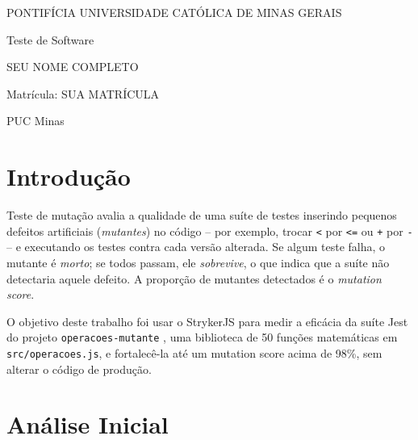 \documentclass[12pt,oneside,a4paper,article,english,brazil]{abntex2}
\newcommand{\disciplina}{Teste de Software}
\newcommand{\nomealuno}{SEU NOME COMPLETO}
\newcommand{\matricula}{SUA MATRÍCULA}
\begin{document}
\frenchspacing

\begin{capa}
  \center
  {\ABNTEXchapterfont\large PONTIFÍCIA UNIVERSIDADE CATÓLICA DE MINAS GERAIS}

  \vspace{0.5cm}
  {\large \disciplina}

  \vfill
  {\ABNTEXchapterfont\large \nomealuno}

  \vspace{0.3cm}
  {\large Matrícula: \matricula}

  \vfill
  {\ABNTEXchapterfont\bfseries\LARGE \imprimirtitulo}

  \vfill
  \large PUC Minas

  \large \imprimirlocal

  \large \imprimirdata

  \vspace*{1cm}
\end{capa}

\textual

\section{Introdução}

Teste de mutação avalia a qualidade de uma suíte de testes inserindo pequenos
defeitos artificiais (\emph{mutantes}) no código -- por exemplo, trocar
\texttt{<} por \texttt{<=} ou \texttt{+} por \texttt{-} -- e executando os
testes contra cada versão alterada. Se algum teste falha, o mutante é
\emph{morto}; se todos passam, ele \emph{sobrevive}, o que indica que a suíte
não detectaria aquele defeito. A proporção de mutantes detectados é o
\emph{mutation score}.

O objetivo deste trabalho foi usar o StrykerJS \cite{stryker-docs} para medir a
eficácia da suíte Jest do projeto \texttt{operacoes-mutante}
\cite{tavares-repo}, uma biblioteca de 50 funções matemáticas em
\texttt{src/operacoes.js}, e fortalecê-la até um mutation score acima de 98\%,
sem alterar o código de produção.

\section{Análise Inicial}
\end{document}
